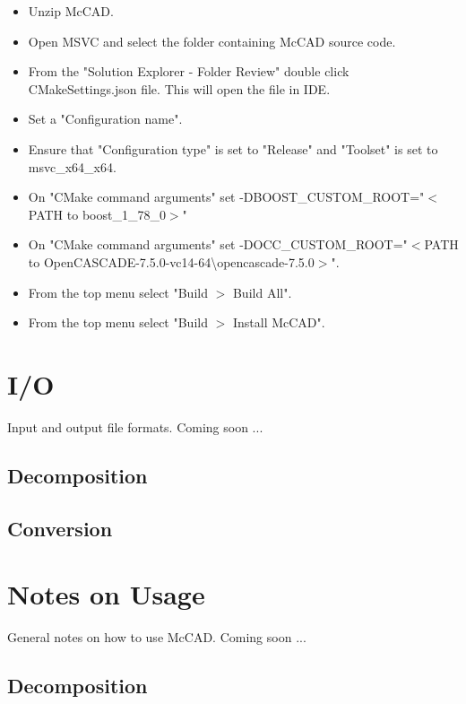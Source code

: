 \documentclass[letterpaper, 10 pt]{report}
\begin{document}
\begin{itemize}
\begin{itemize}
		\item Unzip McCAD.
		\item Open MSVC and select the folder containing McCAD source code.
		\item From the "Solution Explorer - Folder Review" double click CMakeSettings.json file. This will open the file in IDE. \item Set a "Configuration name". 
		\item Ensure that "Configuration type" is set to "Release" and "Toolset" is set to msvc\_x64\_x64.
		\item On "CMake command arguments" set -DBOOST\_CUSTOM\_ROOT="$<$PATH to boost\_1\_78\_0$>$"
		\item On "CMake command arguments" set -DOCC\_CUSTOM\_ROOT="$<$PATH to OpenCASCADE-7.5.0-vc14-64\textbackslash opencascade-7.5.0$>$".
		\item From the top menu select "Build $>$ Build All".
		\item From the top menu select "Build $>$ Install McCAD".
	\end{itemize}
  \end{itemize}

\section{I/O}
Input and output file formats. Coming soon ...
\subsection{Decomposition}
\subsection{Conversion}


\section{Notes on Usage}
General notes on how to use McCAD. Coming soon ...
\subsection{Decomposition}
\end{document}
